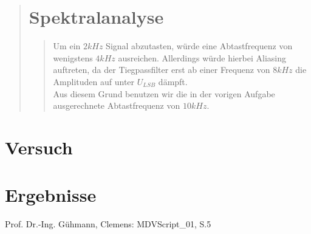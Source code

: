 \begin{quote}
    \section{Spektralanalyse}
    \begin{quote}
    	Um ein $2kHz$ Signal abzutasten, würde eine Abtastfrequenz von wenigstens $4 kHz$ ausreichen. Allerdings würde
    	hierbei Aliasing auftreten, da der Tiegpassfilter erst ab einer Frequenz von $8 kHz$ die Amplituden auf unter
    	$U_{LSB}$ dämpft.\\
    	Aus diesem Grund benutzen wir die in der vorigen Aufgabe ausgerechnete Abtastfrequenz von $10kHz$.
    \end{quote}
\end{quote}


\section{Versuch}
\begin{quote}
	
\end{quote}


\section{Ergebnisse}
\begin{quote}
	
\end{quote}


\begin{thebibliography}{999}
 Prof. Dr.-Ing. Gühmann, Clemens: MDVScript\_01, S.5

\end{thebibliography}





